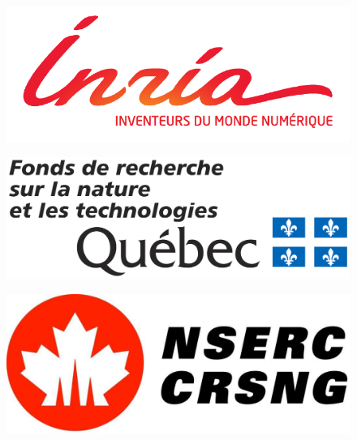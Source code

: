 \documentclass{beamer}
\begin{document}
{\begin{minipage}{0.45\textwidth}
\begin{minipage}{0.45\textwidth}
\begin{figure}
				\centering
			\includegraphics[width=\textwidth]{Figures/logoinria.png}
		\end{figure}
		\begin{figure}
			\centering
			\includegraphics[width=\textwidth]{Figures/logofqrnt.png}
		\end{figure}
		\end{minipage}
		\begin{minipage}{0.45\textwidth}
		\begin{figure}
			\centering
			\includegraphics[width=\textwidth]{Figures/logonserc}
		\end{figure}
		\begin{figure}
			\centering

\end{figure}
\end{minipage}
\end{minipage}}
\end{document}

